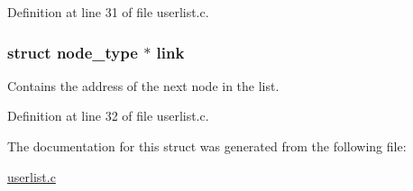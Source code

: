 \-Definition at line 31 of file userlist.\-c.

\hypertarget{structnode__type_a652e8eeb6cbe57963572cc868faae1d0}{
\subsubsection[{link}]{\setlength{\rightskip}{0pt plus 5cm}struct {\bf node\-\_\-type} $\ast$ {\bf link}}}\label{structnode__type_a652e8eeb6cbe57963572cc868faae1d0}


\-Contains the address of the next node in the list. 



\-Definition at line 32 of file userlist.\-c.



\-The documentation for this struct was generated from the following file\-:\begin{DoxyCompactItemize}
\item 
\hyperlink{userlist_8c}{userlist.\-c}\end{DoxyCompactItemize}
